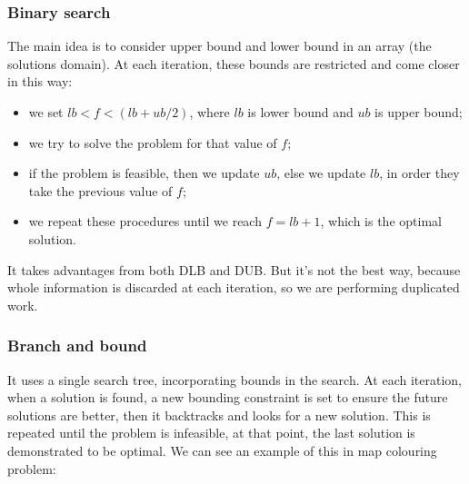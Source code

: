 \documentclass[10pt,a4paper]{article}
\begin{document}
\subsubsection{Binary search}
The main idea is to consider upper bound and lower bound in an array (the
solutions domain). At each iteration, these bounds are restricted and come
closer in this way:
\begin{itemize}
    \item we set $lb < f < (lb + ub / 2)$, where $lb$ is lower bound and $ub$ is
    upper bound;
    \item we try to solve the problem for that value of $f$;
    \item if the problem is feasible, then we update $ub$, else we update $lb$,
    in order they take the previous value of $f$;
    \item we repeat these procedures until we reach $f = lb + 1$, which is the
    optimal solution.
\end{itemize}
It takes advantages from both DLB and DUB. But it's not the best way, because
whole information is discarded at each iteration, so we are performing
duplicated work.

\subsubsection{Branch and bound}
It uses a single search tree, incorporating bounds in the search. At each
iteration, when a solution is found, a new bounding constraint is set to ensure
the future solutions are better, then it backtracks and looks for a new
solution. This is repeated until the problem is infeasible, at that point, the
last solution is demonstrated to be optimal. We can see an example of this in
map colouring problem:

\end{document}
